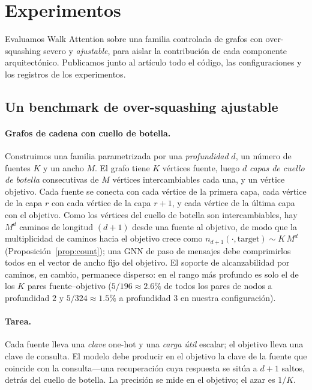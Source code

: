 \section{Experimentos}\label{sec:exp}

Evaluamos Walk Attention sobre una familia controlada de grafos con
over-squashing severo y \emph{ajustable}, para aislar la contribución de cada
componente arquitectónico. Publicamos junto al artículo todo el código, las
configuraciones y los registros de los experimentos.

\subsection{Un benchmark de over-squashing ajustable}

\paragraph{Grafos de cadena con cuello de botella.}
Construimos una familia parametrizada por una \emph{profundidad} $d$, un número de fuentes $K$
y un ancho $M$. El grafo tiene $K$ vértices fuente, luego $d$ \emph{capas de cuello de botella}
consecutivas de $M$ vértices intercambiables cada una, y un
vértice objetivo. Cada fuente se conecta con cada vértice de la primera capa, cada
vértice de la capa $r$ con cada vértice de la capa $r+1$, y cada vértice de
la última capa con el objetivo. Como los vértices del cuello de botella son
intercambiables, hay $M^{d}$ caminos de longitud $(d{+}1)$ desde una fuente al objetivo,
de modo que la multiplicidad de caminos hacia el objetivo crece como
$n_{d+1}(\cdot,\text{target})\sim K\,M^{d}$
(Proposición~\ref{prop:count}); una GNN de paso de mensajes debe comprimirlos todos
en el vector de ancho fijo del objetivo. El soporte de alcanzabilidad por caminos, en cambio,
permanece disperso: en el rango más profundo es solo el de los $K$ pares
fuente--objetivo ($5/196\approx2.6\%$ de todos los pares de nodos a profundidad
$2$ y $5/324\approx1.5\%$ a profundidad $3$ en nuestra configuración).

\paragraph{Tarea.}
Cada fuente lleva una \emph{clave} one-hot y una \emph{carga útil} escalar; el objetivo
lleva una clave de consulta. El modelo debe producir en el objetivo la clave de la
fuente que coincide con la consulta---una recuperación cuya respuesta se sitúa a $d{+}1$
saltos, detrás del cuello de botella. La precisión se mide en el objetivo;
el azar es $1/K$.


